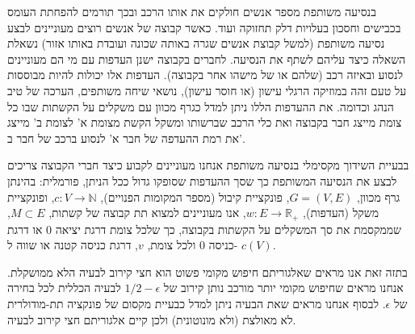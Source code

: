 \begin{hebrew}
בנסיעה משותפת מספר אנשים חולקים את אותו הרכב ובכך תורמים להפחתת העומס בכבישים וחסכון בעלויות דלק תחזוקה ועוד.
כאשר קבוצה של אנשים רוצים מעוניינים לבצע נסיעה משותפת (למשל קבוצת אנשים שגרה באותה שכונה ועובדת באותו אזור) נשאלת השאלה כיצד עליהם לשתף את הנסיעה.
לחברים בקבוצה ישנן העדפות עם מי הם מעוניינים לנסוע ובאיזה רכב (שלהם או של מישהו אחר בקבוצה).
העדפות אלו יכולות להיות מבוססות על טעם זהה במוזיקה הרגלי עישון (או חוסר עישון), נושאי שיחה משותפים, הערכה של טיב הנהג וכדומה.
את ההעדפות הללו ניתן למדל כגרף מכוון עם משקלים על הקשתות שבו כל צומת מייצג חבר בקבוצה ואת כלי הרכב שברשותו ומשקל הקשת מצומת א' לצומת ב' מייצג את רמת ההעדפה של חבר א' לנסוע ברכב של חבר ב'.

בבעיית השידוך מקסימלי בנסיעה משותפת אנחנו מעוניינים לקבוע כיצד חברי הקבוצה צריכים לבצע את הנסיעה המשותפת כך שסך ההעדפות שסופקו גדול ככל הניתן, פורמלית:
בהינתן גרף מכוון,
$G = (V, E)$,
פונקציית קיבול (מספר המקומות הפנויים),
$c:V \to \mathbb{N}$,
ופונקציית משקל (העדפות),
$w:E \to \mathbb{R}_+$,
אנו מעוניינים למצוא תת קבוצה של קשתות,
$M \subset E$,
שממקסמת את סך המשקלים על הקשתות בקבוצה, כך שלכל צומת דרגת יציאה 0 או דרגת כניסה 0 ולכל צומת,
$v$,
דרגת כניסה קטנה או שווה ל-%
$c(V)$.

בתזה זאת אנו מראים שאלגוריתם חיפוש מקומי פשוט הוא חצי קירוב לבעיה הלא ממושקלת.
אנחנו מראים שחיפוש מקומי יותר מורכב נותן קירוב של
$1/2 - \epsilon$
לבעיה הכללית לכל בחירה של
$\epsilon$.
לבסוף אנחנו מראים שאת הבעיה ניתן למדל כבעיית מקסום של פונקציה תת-מודולרית לא מאולצת (ולא מונוטונית) ולכן קיים אלגוריתם חצי קירוב לבעיה.




\end{hebrew}
